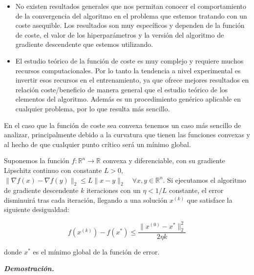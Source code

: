 \begin{itemize}

    \item No existen resultados generales que nos permitan conocer el comportamiento de la convergencia del algoritmo en el problema que estemos tratando con un coste asequible. Los resultados son muy específicos y dependen de la función de coste, el valor de los hiperparámetros y la versión del algoritmo de gradiente descendente que estemos utilizando.

    \item El estudio teórico de la función de coste es muy complejo y requiere muchos recursos computacionales. Por lo tanto la tendencia a nivel experimental es invertir esos recursos en el entrenamiento, ya que ofrece mejores resultados en relación coste/beneficio de manera general que el estudio teórico de los elementos del algoritmo. Además es un procedimiento genérico aplicable en cualquier problema, por lo que resulta más sencillo.

   
\end{itemize}


En el caso que la función de coste sea convexa tenemos un caso más sencillo de analizar, principalmente debido a la curvatura que tienen las funciones convexas y al hecho de que cualquier punto crítico será un mínimo global.





\begin{teorema}\label{proof:gdconvex}
    Suponemos la función $f: \mathbb{R}^n \rightarrow \mathbb{R}$ convexa y diferenciable, con su gradiente Lipschitz continuo con constante $L>0$, $\| \nabla f(x) - \nabla f(y) \|_2 \leq L \|x-y\|_2 \quad \forall x, y \in \mathbb{R}^n$. Si ejecutamos el algoritmo de gradiente descendente $k$ iteraciones con un $\eta<1/L$ constante, el error disminuirá tras cada iteración, llegando a una solución $x^{(k)}$ que satisface la siguiente desigualdad:

    $$f(x^{(k)})-f(x^*) \leq \frac{\|x^{(0)}-x^* \|^2_2}{2\eta k}$$

    donde $x^*$ es el mínimo global de la función de error. 
\end{teorema}

\vspace{1cm}

\begin{flushleft}
   \textbf{\textit{Demostración.}}
\end{flushleft} 



